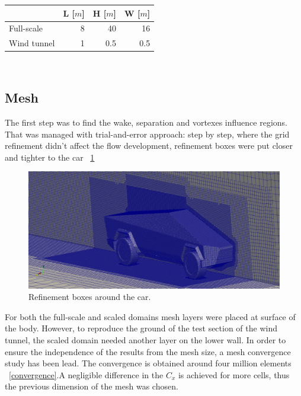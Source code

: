 \documentclass{elbioimp2}
\begin{document}
\begin{tabular}{|l|r|r|r|}
\hline
                & L [$m$]       & H [$m$]   & W [$m$]   \\
\hline
Full-scale      & 8             & 40        & 16        \\
Wind tunnel     & 1             & 0.5       & 0.5       \\
\hline
\end{tabular} \\ 

\subsection{Mesh}

The first step was to find the wake, separation and vortexes influence regions. That was managed with trial-and-error approach: step by step, where the grid refinement didn't affect the flow development, refinement boxes were put closer and tighter to the car ~\ref{boxes}
\begin{figure}[htp]
  \centering
  \includegraphics[width=0.9\columnwidth]{boxes.png}
  \caption{Refinement boxes around the car.\label{boxes}}
\end{figure}

For both the full-scale and scaled domains mesh layers were placed at surface of the body. However, to reproduce the ground of the test section of the wind tunnel, the scaled domain needed another layer on the lower wall.
In order to ensure the independence of the results from the mesh size, a mesh convergence study has been lead. The convergence is obtained around four million elements ~\ref{convergence}.A negligible difference in the $C_x$ is achieved for more cells, thus the previous dimension of the mesh was chosen.
\end{document}
